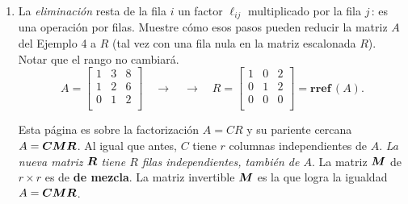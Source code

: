 \documentclass[12pt,a4paper]{article}
\newcommand{\bi}[1]{\hbox{\boldmath$#1$}}
\newcommand\1{\mbox{\,\vrule height-0.8pt depth1.0pt width2pc\,}}
\newcommand\2{\mbox{\,\vrule height-0.8pt depth1.0pt width1pc\,}}
\begin{document}
\begin{enumerate}
\item  La {\it eliminación} resta de la fila $i$ un factor $\ell_{ij}$ multiplicado por la fila $j$\,: es una operación por filas.
Muestre cómo esos pasos pueden reducir la matriz $A$ del Ejemplo 4 a $R$ (tal vez con una fila nula en la matriz escalonada $R$).  Notar que el rango no cambiará.
$$
A=\left[\begin{array}{ccc}1&3&8\\1&2&6\\0&1&2\\\end{array}\right]\quad\rightarrow\quad\rightarrow\quad R=\left[\begin{array}{ccc}1&0&2\\0&1&2\\0&0&0\\\end{array}\right]=\textbf{rref}\,(A).
$$

\newpage
Esta página es sobre la factorización $A = CR$ y su pariente cercana $A =\bi{C} \bi{M} \bi{R}$. Al igual que antes, $C$ tiene $r$ columnas independientes de $A$. {\it La nueva matriz} $\bi{R}$ {\it tiene $R$ filas independientes, también de $A$}. La matriz $\bi{M}$ de $r \times r$  es de \textbf{de mezcla}. La matriz invertible $\bi{M}$ es la que logra la igualdad $A =\bi{C} \bi{M} \bi{R}$.



\end{enumerate}
\end{document}
